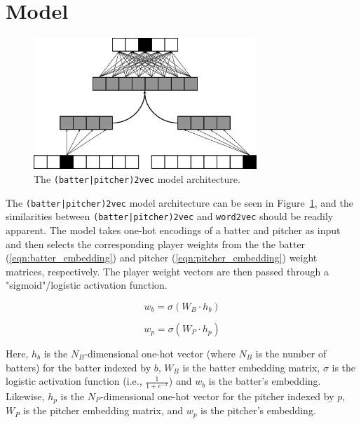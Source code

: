 \documentclass{article}
\begin{document}
\section{Model}
\label{model}

\begin{figure}
\centering
\includegraphics[width=0.75\textwidth,height=\textheight,keepaspectratio]{batter_pitcher_model.png}
\caption{The \texttt{(batter|pitcher)2vec} model architecture.}
\label{fig:batter_pitcher}
\end{figure}

The \texttt{(batter|pitcher)2vec} model architecture can be seen in Figure~\ref{fig:batter_pitcher}, and the similarities between \texttt{(batter|pitcher)2vec} and \texttt{word2vec} should be readily apparent. The model takes one-hot encodings of a batter and pitcher as input and then selects the corresponding player weights from the the batter (\ref{eqn:batter_embedding}) and pitcher (\ref{eqn:pitcher_embedding}) weight matrices, respectively. The player weight vectors are then passed through a "sigmoid"/logistic activation function.

\begin{equation}
\label{eqn:batter_embedding}
w_b = \sigma(W_B \cdot h_b)
\end{equation}

\begin{equation}
\label{eqn:pitcher_embedding}
w_p = \sigma(W_P \cdot h_p)
\end{equation}

Here, $h_b$ is the $N_B$-dimensional one-hot vector (where $N_B$ is the number of batters) for the batter indexed by $b$, $W_B$ is the batter embedding matrix, $\sigma$ is the logistic activation function (i.e., $\frac{1}{1 + e^{-x}}$) and $w_b$ is the batter's embedding. Likewise, $h_p$ is the $N_P$-dimensional one-hot vector for the pitcher indexed by $p$, $W_P$ is the pitcher embedding matrix, and $w_p$ is the pitcher's embedding.
\end{document}
